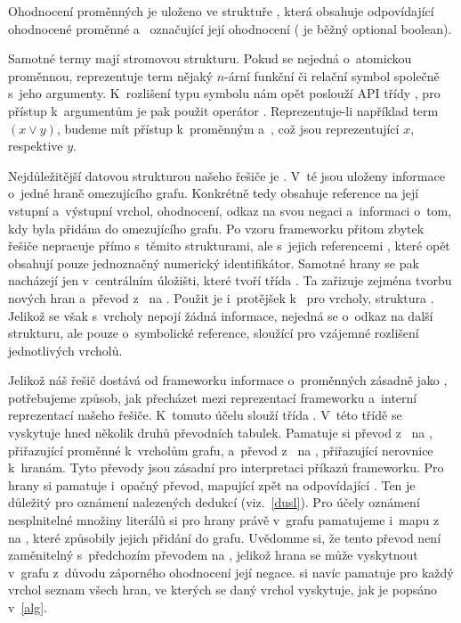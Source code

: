 Ohodnocení proměnných je uloženo ve struktuře , která obsahuje  odpovídající ohodnocené proměnné a~ označující její ohodnocení ( je běžný optional boolean).

Samotné termy mají stromovou strukturu. Pokud se nejedná o~atomickou proměnnou, reprezentuje term nějaký $n$-ární funkční či relační symbol společně s~jeho argumenty. K~rozlišení typu symbolu nám opět poslouží API třídy , pro přístup k~argumentům je pak použit operátor \mono{[]}. Reprezentuje-li například  term $(x \lor y)$, budeme mít přístup k~proměnným  a~, což jsou  reprezentující $x$, respektive $y$. 

Nejdůležitější datovou strukturou našeho řešiče je . V~té jsou uloženy informace o~jedné hraně omezujícího grafu. Konkrétně tedy obsahuje reference na její vstupní a~výstupní vrchol, ohodnocení, odkaz na svou negaci a~informaci o~tom, kdy byla přidána do omezujícího grafu. Po vzoru frameworku přitom zbytek řešiče nepracuje přímo s~těmito strukturami, ale s~jejich referencemi , které opět obsahují pouze jednoznačný numerický identifikátor. Samotné hrany se pak nacházejí jen v~centrálním úložišti, které tvoří třída . Ta zařizuje zejména tvorbu nových hran a~převod z~ na . Použit je i~protějšek k~ pro vrcholy, struktura . Jelikož se však s~vrcholy nepojí žádná informace, nejedná se o~odkaz na další strukturu, ale pouze o~symbolické reference, sloužící pro vzájemné rozlišení jednotlivých vrcholů.

Jelikož náš řešič dostává od frameworku informace o~proměnných zásadně jako , potřebujeme způsob, jak přecházet mezi reprezentací frameworku a~interní reprezentací našeho řešiče. K~tomuto účelu slouží třída . V~této třídě se vyskytuje hned několik druhů převodních tabulek. Pamatuje si převod z~ na , přiřazující proměnné k~vrcholům grafu, a~převod z~ na , přiřazující nerovnice k~hranám. Tyto převody jsou zásadní pro interpretaci příkazů frameworku. Pro hrany si pamatuje i~opačný převod, mapující  zpět na odpovídající . Ten je důležitý pro oznámení nalezených dedukcí (viz.~\ref{dusl}). Pro účely oznámení nesplnitelné množiny literálů si pro hrany právě v~grafu pamatujeme i~mapu z~ na , které způsobily jejich přidání do grafu. Uvědomme si, že tento převod není zaměnitelný s~předchozím převodem na , jelikož hrana se může vyskytnout v~grafu z~důvodu záporného ohodnocení její negace.  si navíc pamatuje pro každý vrchol seznam všech hran, ve kterých se daný vrchol vyskytuje, jak je popsáno v~\ref{alg}.

